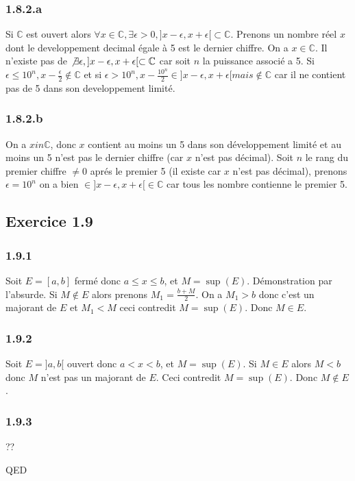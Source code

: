 \documentclass[]{book}
\theoremstyle{definition}
\newcommand{\bb}[1]{\mathbb{#1}}
\newcommand{\C}{\bb{C}}
\begin{document}
\subsubsection*{1.8.2.a}
Si $\C$ est ouvert alors $\forall x \in \C, \exists \epsilon > 0, ]x-\epsilon, x+\epsilon[ \subset \C$. Prenons un nombre r\'eel $x$ dont le developpement decimal \'egale \`a 5 est le dernier chiffre. On a $x \in \C$. Il n'existe pas de $\not\exists \epsilon, ]x-\epsilon, x+\epsilon[ \subset \C$ car soit $n$ la puissance associ\'e a 5. Si $\epsilon \leq 10^{n}, x-\frac{\epsilon}{2} \notin \C$ et si $\epsilon > 10^{n}, x-\frac{10^{n}}{2} \in ]x-\epsilon,x+\epsilon[ mais \notin \C$ car il ne contient pas de 5 dans son developpement limit\'e.

\subsubsection*{1.8.2.b}
On a $x in \C$, donc $x$ contient au moins un 5 dans son d\'eveloppement limit\'e et au moins un 5 n'est pas le dernier chiffre (car $x$ n'est pas d\'ecimal). Soit $n$ le rang du premier chiffre $\neq 0$ apr\'es le premier 5 (il existe car $x$ n'est pas d\'ecimal), prenons $\epsilon = 10^{n}$  on a bien $\in ]x-\epsilon,x+\epsilon[ \in \C$ car tous les nombre contienne le premier 5.


\subsection*{Exercice 1.9}
\subsubsection*{1.9.1}
Soit $E = [a,b]$ ferm\'e donc $a \leq x \leq b$, et $M = \sup(E)$. D\'emonstration par l'absurde. Si $M \not\in E$ alors prenons $M_1 = \frac{b+M}{2}$. On a $M_1 > b$ donc c'est un majorant de $E$ et $M_1 < M$ ceci contredit $M=\sup(E)$. Donc $M \in E$.  

\subsubsection*{1.9.2}
Soit $E = ]a,b[$ ouvert donc $a < x < b$, et $M = \sup(E)$. Si $M \in E$ alors $M < b$ donc $M$ n'est pas un majorant de $E$. Ceci contredit $M=\sup(E)$. Donc $M \not\in E$.  

\subsubsection*{1.9.3}
??

QED
\end{document}
